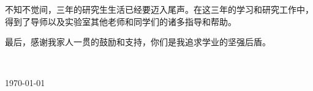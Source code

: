 
\begin{thanks}



不知不觉间，三年的研究生生活已经要迈入尾声。在这三年的学习和研究工作中，得到了导师以及实验室其他老师和同学们的诸多指导和帮助。

最后，感谢我家人一贯的鼓励和支持，你们是我追求学业的坚强后盾。

\vskip 18pt

\begin{flushright}

~~~~ ~~~~

\today

\end{flushright}

\end{thanks}

